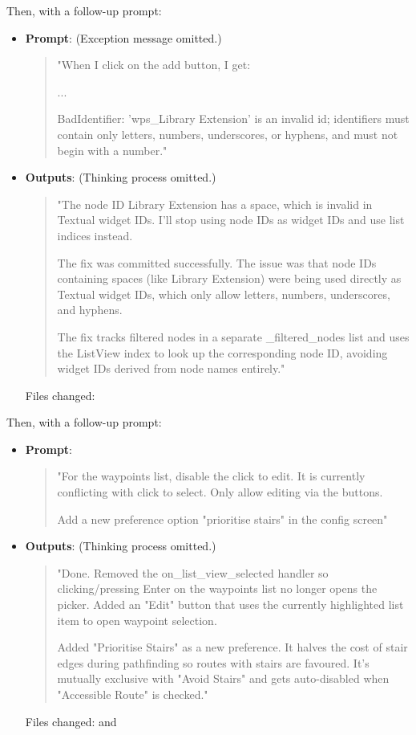 \documentclass[a4paper,10pt]{amsart}
\begin{document}
Then, with a follow-up prompt:
\begin{itemize}
    \item \textbf{Prompt}:
    (Exception message omitted.)
    \begin{quotation}
        \ttfamily "When I click on the add button, I get:

        ...

        BadIdentifier: 'wps\_Library Extension' is an invalid id; identifiers must contain only letters, numbers, underscores, or
        hyphens, and must not begin with a number."
    \end{quotation}
    \item \textbf{Outputs}:
    (Thinking process omitted.)
    \begin{quotation}
        \ttfamily "The node ID Library Extension has a space, which is invalid in Textual widget IDs.
        I'll stop using node IDs as widget IDs and use list indices instead.

        The fix was committed successfully.
        The issue was that node IDs containing spaces (like Library Extension) were being used directly as Textual widget IDs, which only allow letters, numbers, underscores, and hyphens.

        The fix tracks filtered nodes in a separate \_filtered\_nodes list and uses the ListView index to look up the corresponding node ID, avoiding widget IDs derived from node names entirely."
    \end{quotation}
    Files changed: 
\end{itemize}

Then, with a follow-up prompt:
\begin{itemize}
    \item \textbf{Prompt}:
    \begin{quotation}
        \ttfamily "For the waypoints list, disable the click to edit.
        It is currently conflicting with click to select.
        Only allow editing via the buttons.
        
        Add a new preference option "prioritise stairs" in the config screen"
    \end{quotation}
    \item \textbf{Outputs}:
    (Thinking process omitted.)
    \begin{quotation}
        \ttfamily "Done.
        Removed the on\_list\_view\_selected handler so clicking/pressing Enter on the waypoints list no longer opens the picker.
        Added an "Edit" button that uses the currently highlighted list item to open waypoint selection.

        Added "Prioritise Stairs" as a new preference.
        It halves the cost of stair edges during pathfinding so routes with stairs are favoured.
        It's mutually exclusive with "Avoid Stairs" and gets auto-disabled when "Accessible Route" is checked."
    \end{quotation}
    Files changed:  and 
\end{itemize}
\end{document}
